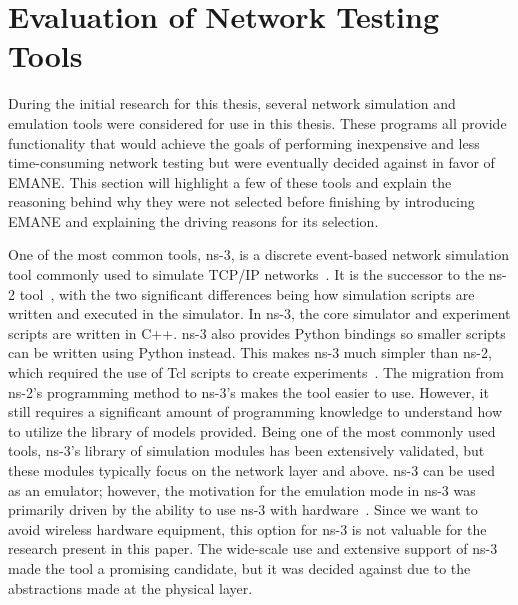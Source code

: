 \begin{table}[!ht]
\begin{adjustbox}{width=\textwidth, center=\textwidth}
\begin{tabular}{|l|l|l|}
			\hline
		\end{tabular}
	\end{adjustbox}
	\label{simtable}
\end{table}

\section{Evaluation of Network Testing Tools} %
During the initial research for this thesis, several network simulation and emulation tools were considered for use in this thesis.
These programs all provide functionality that would achieve the goals of performing inexpensive and less time-consuming network testing but were eventually decided against in favor of EMANE.
This section will highlight a few of these tools and explain the reasoning behind why they were not selected before finishing by introducing EMANE and explaining the driving reasons for its selection.\par

One of the most common tools, ns-3, is a discrete event-based network simulation tool commonly used to simulate TCP/IP networks~\cite{ns3}.
It is the successor to the ns-2 tool~\cite{ns2}, with the two significant differences being how simulation scripts are written and executed in the simulator.
In ns-3, the core simulator and experiment scripts are written in C++. ns-3 also provides Python bindings so smaller scripts can be written using Python instead.
This makes ns-3 much simpler than ns-2, which required the use of Tcl scripts to create experiments~\cite{ns2_ns3}.
The migration from ns-2's programming method to ns-3's makes the tool easier to use.
However, it still requires a significant amount of programming knowledge to understand how to utilize the library of models provided.
Being one of the most commonly used tools, ns-3's library of simulation modules has been extensively validated, but these modules typically focus on the network layer and above.
ns-3 can be used as an emulator; however, the motivation for the emulation mode in ns-3 was primarily driven by the ability to use ns-3 with hardware~\cite{ns3_orbit}.
Since we want to avoid wireless hardware equipment, this option for ns-3 is not valuable for the research present in this paper.
The wide-scale use and extensive support of ns-3 made the tool a promising candidate, but it was decided against due to the abstractions made at the physical layer.\par

